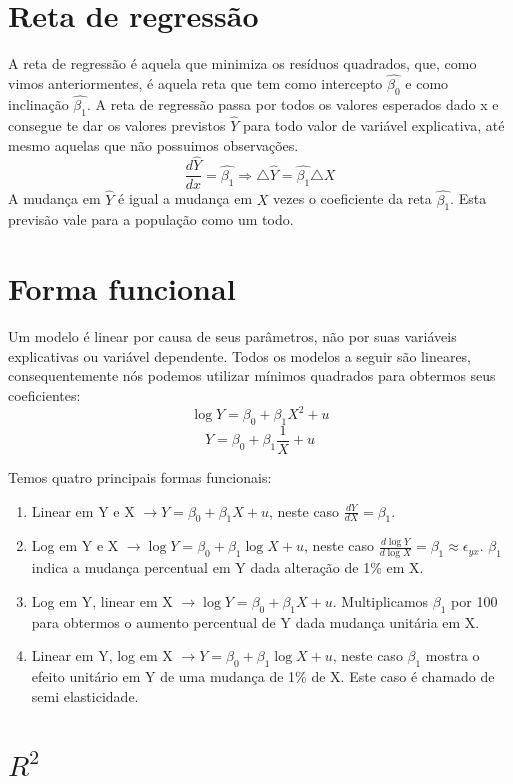 \documentclass[12pt,a4paper,oneside,brazil]{abntex2}
\begin{document}
 \section{Reta de regressão}
 A reta de regressão é aquela que minimiza os resíduos quadrados, que, como vimos anteriormentes, é aquela reta que tem como intercepto $\hat{\beta_0}$ e como inclinação $\hat{\beta_1}$. A reta de regressão passa por todos os valores esperados dado x e consegue te dar os valores previstos $\hat{Y}$ para todo valor de variável explicativa, até mesmo aquelas que não possuimos observações.
 \[ \frac{d\hat{Y}}{dx} = \hat{\beta_1} \Rightarrow \triangle \hat{Y} = \hat{\beta_1} \triangle X \]
A mudança em $ \hat{Y}$ é igual a mudança em $X$ vezes o coeficiente da reta $\hat{\beta_1}$. Esta previsão vale para a população como um todo.

\section{Forma funcional}
Um modelo é linear por causa de seus parâmetros, não por suas variáveis explicativas ou variável dependente. Todos os modelos a seguir são lineares, consequentemente nós podemos utilizar mínimos quadrados para obtermos seus coeficientes:
\[ \log Y = \beta_0 + \beta_1 X^2+ u \]
\[ Y = \beta_0 + \beta_1 \frac{1}{X} + u \]

Temos quatro principais formas funcionais:
\begin{enumerate}
\item Linear em Y e X $\rightarrow Y = \beta_0 + \beta_1 X + u$, neste caso $\frac{d Y}{d X} = \beta_1$.
\item Log em Y e  X $ \rightarrow \log Y = \beta_0 + \beta_1 \log X + u$, neste caso $\frac{d \log Y}{d \log X} = \beta_1 \approx \epsilon_{yx}$. $\beta_1$ indica a mudança percentual em Y dada alteração de 1\% em X.
\item Log em Y, linear em X $ \rightarrow \log Y = \beta_0 + \beta_1  X + u$. Multiplicamos $\beta_1$ por 100 para obtermos o aumento percentual de Y dada mudança unitária em X.
\item Linear em Y, log em X $ \rightarrow Y = \beta_0 + \beta_1 \log X + u$, neste caso $\beta_1$ mostra o efeito unitário em Y de uma mudança de 1\% de X. Este caso é chamado de semi elasticidade.
\end{enumerate}

\section{$R^2$}
\end{document}
